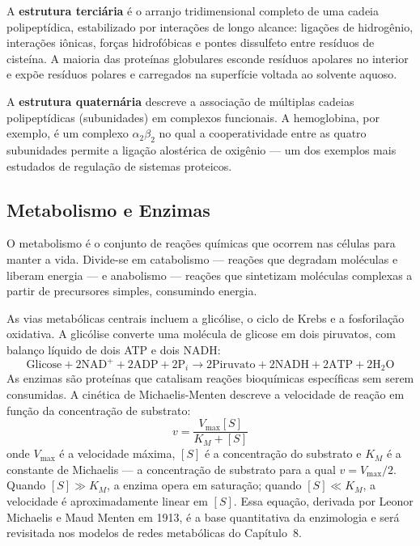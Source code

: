 A \textbf{estrutura terciária} é o arranjo tridimensional completo de uma cadeia polipeptídica,
estabilizado por interações de longo alcance: ligações de hidrogênio, interações iônicas,
forças hidrofóbicas e pontes dissulfeto entre resíduos de cisteína. A maioria das proteínas
globulares esconde resíduos apolares no interior e expõe resíduos polares e carregados na
superfície voltada ao solvente aquoso.

A \textbf{estrutura quaternária} descreve a associação de múltiplas cadeias polipeptídicas
(subunidades) em complexos funcionais. A hemoglobina, por exemplo, é um complexo
$\alpha_2\beta_2$ no qual a cooperatividade entre as quatro subunidades permite a ligação
alostérica de oxigênio --- um dos exemplos mais estudados de regulação de sistemas proteicos.

\subsection{Metabolismo e Enzimas}

\begin{definicaoenv}[Metabolismo]
O metabolismo é o conjunto de reações químicas que ocorrem nas células para manter a vida.
Divide-se em catabolismo --- reações que degradam moléculas e liberam energia --- e
anabolismo --- reações que sintetizam moléculas complexas a partir de precursores simples,
consumindo energia.
\end{definicaoenv}

As vias metabólicas centrais incluem a glicólise, o ciclo de Krebs e a fosforilação
oxidativa. A glicólise converte uma molécula de glicose em dois piruvatos, com balanço
líquido de dois ATP e dois NADH:
\begin{equation}
\text{Glicose} + 2\text{NAD}^+ + 2\text{ADP} + 2\text{P}_i
\rightarrow 2\text{Piruvato} + 2\text{NADH} + 2\text{ATP} + 2\text{H}_2\text{O}
\end{equation}
As enzimas são proteínas que catalisam reações bioquímicas específicas sem serem consumidas.
A cinética de Michaelis-Menten descreve a velocidade de reação em função da concentração
de substrato:
\begin{equation}
v = \frac{V_{\max}[S]}{K_M + [S]}
\end{equation}
onde $V_{\max}$ é a velocidade máxima, $[S]$ é a concentração do substrato e $K_M$ é a
constante de Michaelis --- a concentração de substrato para a qual $v = V_{\max}/2$.
Quando $[S] \gg K_M$, a enzima opera em saturação; quando $[S] \ll K_M$, a velocidade é
aproximadamente linear em $[S]$. Essa equação, derivada por Leonor Michaelis e Maud
Menten em 1913, é a base quantitativa da enzimologia e será revisitada nos modelos de
redes metabólicas do Capítulo~8.

